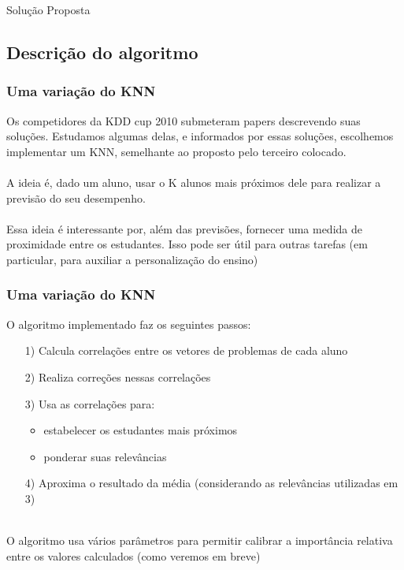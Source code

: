 \documentclass{article}
\begin{document}
   \begin{section}{Solução Proposta}
   \subsection{Descrição do algoritmo}
   \subsubsection{Uma variação do KNN}
     Os competidores da KDD cup 2010 submeteram papers descrevendo suas soluções. Estudamos algumas delas, e informados por essas soluções, escolhemos implementar um KNN, semelhante ao proposto pelo terceiro colocado.\\~\\

     A ideia é, dado um aluno, usar o K alunos mais próximos dele para realizar a previsão do seu desempenho.\\~\\

     Essa ideia é interessante por, além das previsões, fornecer uma medida de proximidade entre os estudantes. Isso pode ser útil para outras tarefas (em particular, para auxiliar a personalização do ensino)


   \subsubsection{Uma variação do KNN}
     O algoritmo implementado faz os seguintes passos:
     \begin{itemize}
     \item[1)] Calcula correlações entre os vetores de problemas de cada aluno
     \item[2)] Realiza correções nessas correlações
     \item[3)] Usa as correlações para:
        \begin{itemize}
        \item estabelecer os estudantes mais próximos
        \item ponderar suas relevâncias
        \end{itemize}
     \item[4)] Aproxima o resultado da média (considerando as relevâncias utilizadas em 3)\\~\\
     \end{itemize}
     
     O algoritmo usa vários parâmetros para permitir calibrar a importância relativa entre os valores calculados (como veremos em breve)



\end{section}
\end{document}
